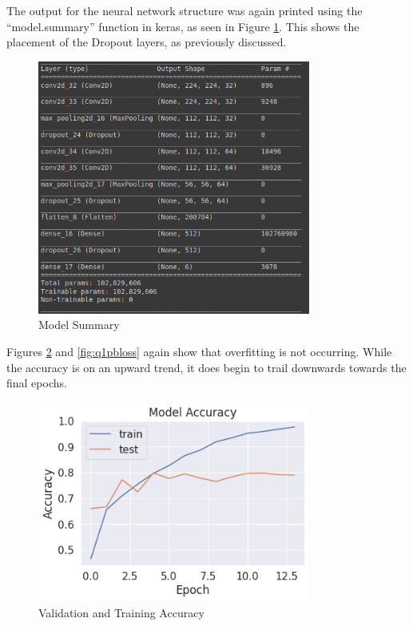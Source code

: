 The output for the neural network structure was again printed using the
``model.summary'' function in keras, as seen in Figure \ref{fig:q1pbmodel}.
This shows the placement of the Dropout layers, as previously discussed.

\begin{figure}[H]
	\centering
	\includegraphics[width=0.8\textwidth]{images/q1/pb/q1pbmodel}
	\caption{Model Summary}
	\label{fig:q1pbmodel}
\end{figure}

Figures \ref{fig:q1pbacc} and \ref{fig:q1pbloss} again show that overfitting is
not occurring. While the accuracy is on an upward trend, it does begin to trail
downwards towards the final epochs.

\begin{figure}[H]
	\centering
	\includegraphics[width=0.8\textwidth]{images/q1/pb/accuracy}
	\caption{Validation and Training Accuracy}
	\label{fig:q1pbacc}
\end{figure}

